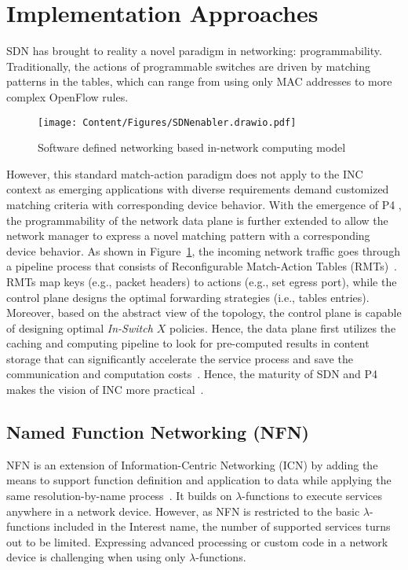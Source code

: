 \section{Implementation Approaches}\label{Implementation}
\noindent SDN has brought to reality a novel paradigm in networking: programmability. Traditionally, the actions of programmable switches are driven by matching patterns in the tables, which can range from using only MAC addresses to more complex OpenFlow rules. 
\begin{figure}[!h]
\centering
\texttt{[image: Content/Figures/SDNenabler.drawio.pdf]}
\caption{Software defined networking based in-network computing model}
\label{fig:SDNenabler}
\end{figure}
However, this standard match-action paradigm does not apply to the INC context as emerging applications with diverse requirements demand customized matching criteria with corresponding device behavior. 
With the emergence of P4 \cite{bosshart2014p4}, the programmability of the network data plane is further extended to allow the network manager to express a novel matching pattern with a corresponding device behavior. As shown in Figure~\ref{fig:SDNenabler}, the incoming network traffic goes through a pipeline process that consists of Reconfigurable Match-Action Tables (RMTs)~\cite{bosshart2013forwarding}. RMTs map keys (e.g., packet headers) to actions (e.g., set egress port), while the control plane designs the optimal forwarding strategies (i.e., tables entries). Moreover, based on the abstract view of the topology, the control plane is capable of designing optimal \textit{In-Switch $X$} policies. Hence, the data plane first utilizes the caching and computing pipeline to look for pre-computed results in content storage that can significantly accelerate the service process and save the communication and computation costs~\cite{li2021advancing}. Hence, the maturity of SDN and P4 makes the vision of INC more practical~\cite{bosshart2014p4}.

\subsection{Named Function Networking (NFN)} \label{NFN}
\noindent NFN is an extension of Information-Centric Networking (ICN) by adding the means to support function definition and application to data while applying the same resolution-by-name process~\cite{sifalakis2014information}. It builds on $\lambda$-functions to execute services anywhere in a network device. However, as NFN is restricted to the basic $\lambda$-functions included in the Interest name, the number of supported services turns out to be limited. Expressing advanced processing or custom code in a network device is challenging when using only $\lambda$-functions. 
 
